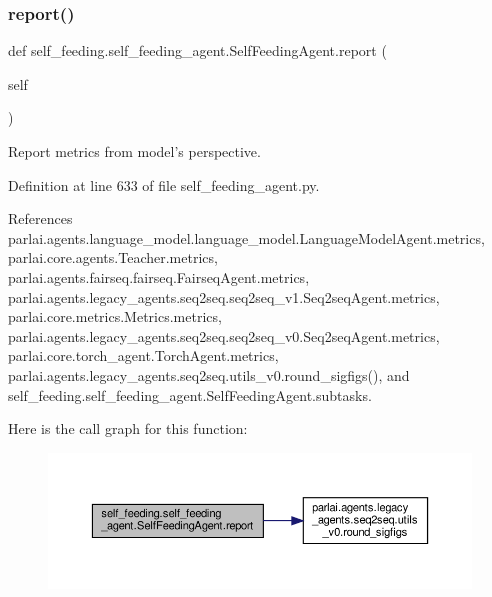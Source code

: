 \subsubsection{\texorpdfstring{report()}{report()}}
{\footnotesize\ttfamily def self\+\_\+feeding.\+self\+\_\+feeding\+\_\+agent.\+Self\+Feeding\+Agent.\+report (\begin{DoxyParamCaption}\item[{}]{self }\end{DoxyParamCaption})}

\begin{DoxyVerb}Report metrics from model's perspective.\end{DoxyVerb}
 

Definition at line 633 of file self\+\_\+feeding\+\_\+agent.\+py.



References parlai.\+agents.\+language\+\_\+model.\+language\+\_\+model.\+Language\+Model\+Agent.\+metrics, parlai.\+core.\+agents.\+Teacher.\+metrics, parlai.\+agents.\+fairseq.\+fairseq.\+Fairseq\+Agent.\+metrics, parlai.\+agents.\+legacy\+\_\+agents.\+seq2seq.\+seq2seq\+\_\+v1.\+Seq2seq\+Agent.\+metrics, parlai.\+core.\+metrics.\+Metrics.\+metrics, parlai.\+agents.\+legacy\+\_\+agents.\+seq2seq.\+seq2seq\+\_\+v0.\+Seq2seq\+Agent.\+metrics, parlai.\+core.\+torch\+\_\+agent.\+Torch\+Agent.\+metrics, parlai.\+agents.\+legacy\+\_\+agents.\+seq2seq.\+utils\+\_\+v0.\+round\+\_\+sigfigs(), and self\+\_\+feeding.\+self\+\_\+feeding\+\_\+agent.\+Self\+Feeding\+Agent.\+subtasks.

Here is the call graph for this function\+:
\nopagebreak
\begin{figure}[H]
\begin{center}
\leavevmode
\includegraphics[width=350pt]{classself__feeding_1_1self__feeding__agent_1_1SelfFeedingAgent_a0731b4f9dc3e9763fbccaf48e531f3c6_cgraph}
\end{center}
\end{figure}
\mbox{\label{classself__feeding_1_1self__feeding__agent_1_1SelfFeedingAgent_ae2a86795d3df6fbd0b0a41825922b247}} 
